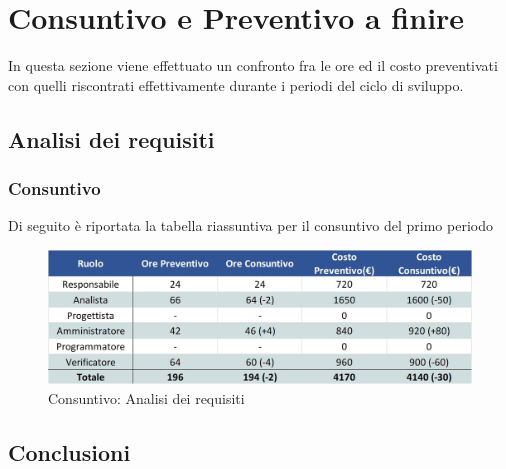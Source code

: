 \newpage
\section{Consuntivo e Preventivo a finire}

In questa sezione viene effettuato un confronto fra le ore ed il costo preventivati con quelli riscontrati effettivamente durante i periodi del ciclo di sviluppo.
\subsection{Analisi dei requisiti}
\subsubsection{Consuntivo}
Di seguito è riportata la tabella riassuntiva per il consuntivo del primo periodo
\begin{figure}[h!]
	\centerline{\includegraphics[scale=0.4]{img/Preventivo/AnalisiRequisiti.Consuntivo.jpg}}
	\caption{Consuntivo: Analisi dei requisiti}
\end{figure}
\subsection{Conclusioni}
